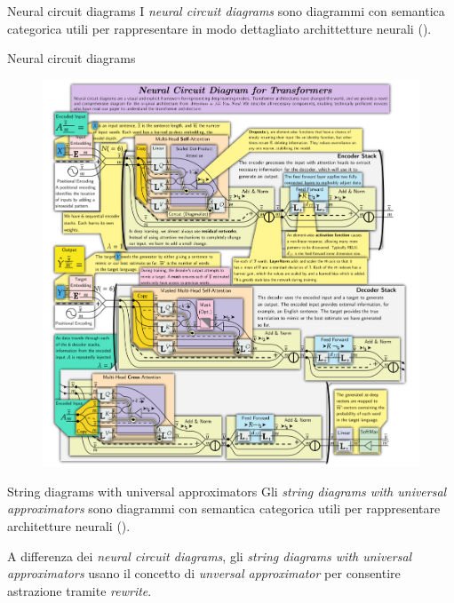 \documentclass{beamer}
\begin{document}
\begin{frame}{Neural circuit diagrams}
    I \textit{neural circuit diagrams} sono diagrammi con semantica categorica utili per rappresentare in modo dettagliato archittetture neurali (\cite{abbott2023robust}).
\end{frame}

\begin{frame}{Neural circuit diagrams}
    \begin{figure}
        \begin{center}
            \includegraphics[angle=90,width=1\textwidth]{figures/transformer_ncd.png}
            \caption*{\cite{abbott2023robust}}
        \end{center}
    \end{figure}
\end{frame}

\begin{frame}{String diagrams with universal approximators}
    Gli \textit{string diagrams with universal approximators} sono diagrammi con semantica categorica utili per rappresentare architetture neurali (\cite{khatri2024anatomy}).
    
    A differenza dei \textit{neural circuit diagrams}, gli \textit{string diagrams with universal approximators} usano il concetto di \textit{unversal approximator} per consentire astrazione tramite \textit{rewrite}.
\end{frame}
\end{document}
